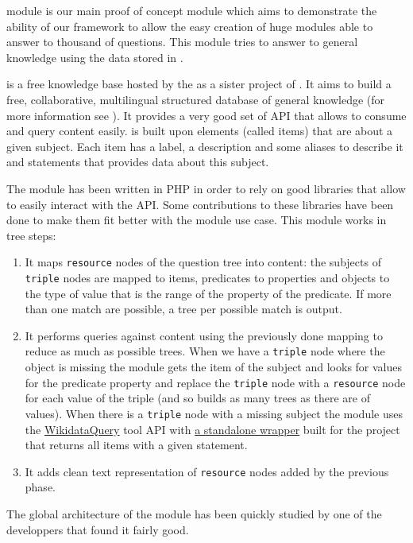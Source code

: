 \Wikidata module is our main proof of concept module which aims to demonstrate the ability of our framework to allow the easy creation of huge modules able to answer to thousand of questions. This module tries to answer to general knowledge using the data stored in \href{http://www.wikidata.org}{\Wikidata}.

\Wikidata is a free knowledge base hosted by the \Wikimedia as a sister project of \Wikipedia. It aims to build a free, collaborative, multilingual structured database of general knowledge (for more information see \cite{42240}). It provides a very good set of API that allows to consume and query \Wikidata content easily. \Wikidata is built upon elements (called items) that are about a given subject. Each item has a label, a description and some aliases to describe it and statements that provides data about this subject.

The \Wikidata module has been written in PHP in order to rely on good libraries that allow to easily interact with the \Wikidata API. Some contributions to these libraries have been done to make them fit better with the module use case. This module works in tree steps:
\begin{enumerate}
    \item It maps \texttt{resource} nodes of the question tree into \Wikidata content: the subjects of \texttt{triple} nodes are mapped to \Wikidata items, predicates to \Wikidata properties and objects to the type of value that is the range of the \Wikidata property of the predicate. If more than one match are possible, a tree per possible match is output.
    \item It performs queries against \Wikidata content using the previously done mapping to reduce as much as possible trees. When we have a \texttt{triple} node where the object is missing the module gets the \Wikidata item of the subject and looks for values for the predicate property and replace the \texttt{triple} node with a \texttt{resource} node for each value of the triple (and so builds as many trees as there are of values). When there is a \texttt{triple} node with a missing subject the module uses the \href{http://wdq.wmflabs.org}{WikidataQuery} tool API with \href{https://github.com/ProjetPP/WikidataQueryApi}{a standalone wrapper} built for the project that returns all items with a given statement.
    \item It adds clean text representation of \texttt{resource} nodes added by the previous phase.
\end{enumerate}

The global architecture of the module has been quickly studied by one of the \Wikidata developpers that found it fairly good.
